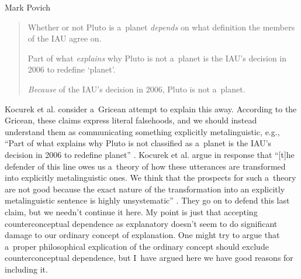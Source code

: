 \begin{artengenv}{Mark Povich}
\begin{quote}
Whether or not Pluto is a~planet \textit{depends} on what definition the members of the IAU agree on.

Part of what \textit{explains} why Pluto is not a~planet is the IAU's decision in 2006 to redefine ‘planet'.

\textit{Because} of the IAU's decision in 2006, Pluto is not a~planet.
\parencite[][p.7, my emphasis]{kocurek_against_2020}%
\end{quote}
Kocurek et al. consider a~Gricean attempt to explain this away. According to the Gricean, these claims express literal falsehoods, and we should instead understand them as communicating something explicitly metalinguistic, e.g., ``Part of what explains why Pluto is not classified as a~planet is the IAU's decision in 2006 to redefine \guillemotleft planet\guillemotright''
\parencite*[][p.7]{kocurek_against_2020}. %
 Kocurek et al. argue in response that ``[t]he defender of this line owes us a~theory of how these utterances are transformed into explicitly metalinguistic ones. We think that the prospects for such a~theory are not good because the exact nature of the transformation into an explicitly metalinguistic sentence is highly unsystematic'' 
\parencite*[][p.7]{kocurek_against_2020}. %
 They go on to defend this last claim, but we needn't continue it here. My point is just that accepting counterconceptual dependence as explanatory doesn't seem to do significant damage to our ordinary concept of explanation. One might try to argue that a~proper philosophical explication of the ordinary concept should exclude counterconceptual dependence, but I~have argued here we have good reasons for including it.


\end{artengenv}
